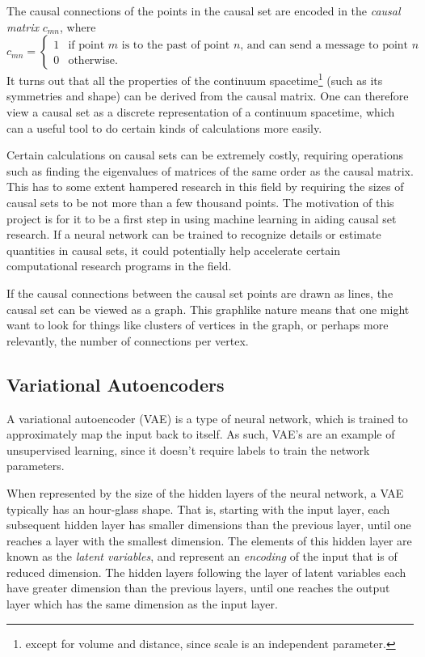 \documentclass[letterpaper,10pt]{article}
\begin{document}
The causal connections of the points in the causal set are encoded in the {\it causal matrix} $c_{mn}$, where
\begin{equation}
 c_{mn} = \begin{cases}
      1 & \text{if point $m$ is to the past of point $n$, and can send a message to point $n$}\\
      0 & \text{otherwise.}
    \end{cases} 
\end{equation}
It turns out that all the properties of the continuum spacetime\footnote{except for volume and distance, since scale is an independent 
parameter.} (such as its symmetries and shape) can be derived from the causal matrix.  One can therefore view a causal set as a discrete representation 
of a continuum spacetime, which can a useful tool to do certain kinds of calculations more easily.

Certain calculations on causal sets can be extremely costly, requiring operations such as finding the eigenvalues of matrices of the same order as the 
causal matrix.  This has to some extent hampered research in this field by requiring the sizes of causal sets to be not more than a few thousand points.  
The motivation of this project is for it to be a first step in using machine learning in aiding causal set research.  If a neural network can be trained
to recognize details or estimate quantities in causal sets, it could potentially help accelerate certain computational research programs in the field.

If the causal connections between the causal set points are drawn as lines, the causal set can be viewed as a graph.  This graphlike nature means that 
one might want to look for things like clusters of vertices in the graph, or perhaps more relevantly, the number of connections per vertex.

\subsection{Variational Autoencoders}

A variational autoencoder \cite{vae} (VAE) is a type of neural network, which is trained to approximately map the input back to itself.  As such, 
VAE's are an example of unsupervised learning, since it doesn't require labels to train the network parameters.

When represented by the size of the hidden layers of the neural network, a VAE typically has an hour-glass shape.  That is, starting with the input layer, 
each subsequent hidden layer has smaller dimensions than the previous layer, until one reaches a layer with the smallest dimension.  
The elements of this hidden layer are known as the {\it latent variables}, and represent an {\it encoding} of the input that is of reduced dimension.  
The hidden layers following the layer of latent variables each have greater dimension than the previous layers, until one reaches the output layer which 
has the same dimension as the input layer.
\end{document}

